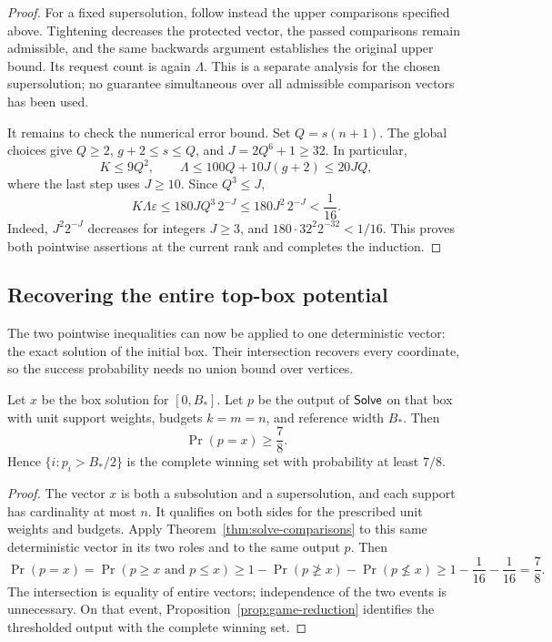 \begin{proof}
For a fixed supersolution, follow instead the upper comparisons
specified above. Tightening decreases the protected vector, the
passed comparisons remain admissible, and the same backwards
argument establishes the original upper bound. Its request count
is again \(\Lambda\). This is a separate analysis for the chosen
supersolution; no guarantee simultaneous over all admissible
comparison vectors has been used.

It remains to check the numerical error bound. Set \(Q=s(n+1)\).
The global choices give \(Q\ge2\), \(g+2\le s\le Q\), and
\(J=2Q^6+1\ge32\). In particular,
\[
 K\le 9Q^2,
 \qquad
 \Lambda\le100Q+10J(g+2)\le20JQ,
\]
where the last step uses \(J\ge10\). Since \(Q^3\le J\),
\begin{equation}
 K\Lambda\varepsilon
 \le180JQ^3\,2^{-J}
 \le180J^2\,2^{-J}
 <\frac1{16}.
 \label{sol:chain-error-bound}
\end{equation}
Indeed, \(J^2 2^{-J}\) decreases for integers \(J\ge3\), and
\(180\cdot32^2 2^{-32}<1/16\). This proves both pointwise
assertions at the current rank and completes the induction.
\end{proof}

\subsection{Recovering the entire top-box potential}

The two pointwise inequalities can now be applied to one deterministic
vector: the exact solution of the initial box. Their intersection
recovers every coordinate, so the success probability needs no union
bound over vertices.

\begin{corollary}
\label{cor:top-success}
Let \(x\) be the box solution for \([0,B_*]\). Let \(p\) be the
output of \(\mathsf{Solve}\) on that box with unit support weights,
budgets \(k=m=n\), and reference width \(B_*\). Then
\[
 \Pr(p=x)\ge\frac78.
\]
Hence \(\{i:p_i>B_*/2\}\) is the complete winning set with
probability at least \(7/8\).
\end{corollary}

\begin{proof}
The vector \(x\) is both a subsolution and a supersolution, and
each support has cardinality at most \(n\). It qualifies on both
sides for the prescribed unit weights and budgets. Apply
Theorem~\ref{thm:solve-comparisons} to this same deterministic
vector in its two roles and to the same output \(p\). Then
\[
 \Pr(p=x)
 =\Pr(p\ge x\text{ and }p\le x)
 \ge1-\Pr(p\not\ge x)-\Pr(p\not\le x)
 \ge1-\frac1{16}-\frac1{16}=\frac78.
\]
The intersection is equality of entire vectors; independence of the
two events is unnecessary. On that event,
Proposition~\ref{prop:game-reduction} identifies the thresholded
output with the complete winning set.
\end{proof}

